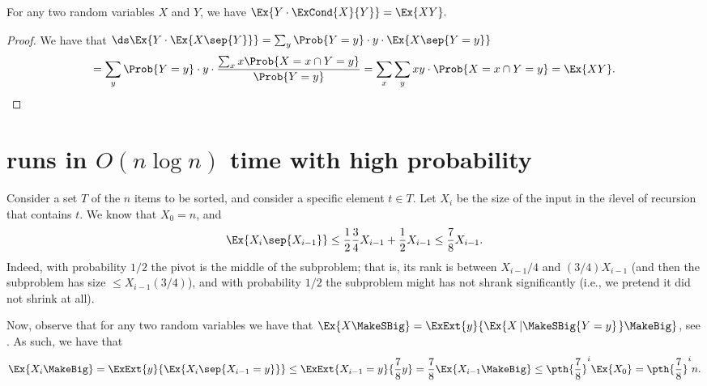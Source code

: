 \begin{lemma}
    For any two random variables $X$ and $Y$, we have
    \begin{math}
        \Ex{\bigl.Y \cdot \ExCond{X }{Y}} = \Ex{\bigl. X Y}.
    \end{math}
\end{lemma}
\begin{proof}
    We have that
    \begin{math}
        \ds%
        \Ex{Y \cdot \Ex{X \sep{Y}}}%
        =%
        \sum_y \Prob{Y = y} \cdot y \cdot \Ex{X \sep{Y =y }}
    \end{math}
    \begin{equation*}
        =%
        \sum_y \Prob{Y = y} \cdot y \cdot \frac{\sum_{x} x \Prob{X = x
              \cap Y=y}}{\Prob{Y=y}}%
        =%
        \sum_x \sum_y x y \cdot \Prob{ \bigl. X = x \cap Y = y}%
        =%
        \Ex{\bigl. X Y}.
    \end{equation*}
\end{proof}


\section{\QuickSort{} runs in $O(n \log n)$ time with high
   probability}

Consider a set $T$ of the $n$ items to be sorted, and consider a
specific element $t \in T$. Let $X_i$ be the size of the input in the
$i$\th level of recursion that contains $t$. We know that $X_0 = n$,
and
\begin{align*}
    \Ex{X_i \sep{ X_{i-1}}}%
    \leq%
    \frac{1}{2} \frac{3}{4} X_{i-1} + \frac{1}{2} X_{i-1}%
    \leq%
    \frac{7}{8} X_{i-1}.
\end{align*}
Indeed, with probability $1/2$ the pivot is the middle of the
subproblem; that is, its rank is between $X_{i-1}/4$ and
$(3/4)X_{i-1}$ (and then the subproblem has size $\leq X_{i-1}(3/4)$),
and with probability $1/2$ the subproblem might has not shrank
significantly (i.e., we pretend it did not shrink at all).

Now, observe that for any two random variables we have that
$\Ex{X \MakeSBig } = \ExExt{y}{\Ex{X\left| \MakeSBig {Y=y}
      \right.}\MakeBig }$, see . As
such, we have that
\begin{align*}
    \Ex{X_i \MakeBig }%
    =%
    \ExExt{y}{\Ex{X_i\sep{X_{i-1}=y}}\Bigl. }%
    \leq%
    \ExExt{X_{i-1}=y}{ \frac{7}{8} y }%
    =%
    \frac{7}{8} \Ex{X_{i-1}\MakeBig }%
    \leq%
    \pth{\frac{7}{8}}^i \Ex{X_0}%
    =%
    \pth{\frac{7}{8}}^i n.
\end{align*}

